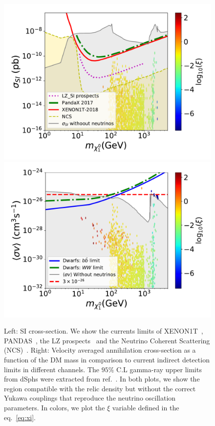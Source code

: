 \documentclass[12pt,letterpaper]{article}
\begin{document}
\begin{figure}
\begin{center}
\includegraphics[scale=0.43]{sigmaSI_with_neutrino_physics}
\includegraphics[scale=0.43]{sigmav_with_neutrino_physics}
\caption{Left: SI cross-section. We show the currents limits of XENON1T~\cite{Aprile:2018dbl}, PANDAS~\cite{Cui:2017nnn}, the LZ prospects~\cite{Mount:2017qzi} and the Neutrino Coherent Scattering (NCS)~\cite{Cushman:2013zza, Billard:2013qya}. 
Right:  Velocity averaged annihilation cross-section as a function of the DM
mass in comparison to current indirect detection limits in different channels. The $95\%$ C.L gamma-ray upper limits from dSphs were extracted from ref.~\cite{Ackermann:2015zua}.
In both plots, we show  the region compatible with the relic density but without the correct Yukawa couplings that reproduce the neutrino oscillation parameters. In colors, we plot the $\xi$ variable defined in the eq.~\ref{eq:xi}.
}
\label{fig:SI-and-sv-with-neutrinos-scan}
\end{center}
\end{figure}
\end{document}

